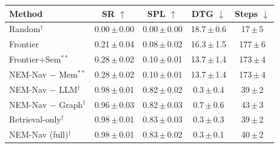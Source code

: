 \begin{tabular}{l@{\hspace{6pt}}cccc}
\toprule
\textbf{Method} & \textbf{SR} $\uparrow$ & \textbf{SPL} $\uparrow$ & \textbf{DTG} $\downarrow$ & \textbf{Steps} $\downarrow$ \\
\midrule
Random$^{\dagger}$ & 0.00\,$\pm$\,0.00 & 0.00\,$\pm$\,0.00 & 18.7\,$\pm$\,0.6 & 17\,$\pm$\,5 \\
Frontier & 0.21\,$\pm$\,0.04 & 0.08\,$\pm$\,0.02 & 16.3\,$\pm$\,1.5 & 177\,$\pm$\,6 \\
Frontier+Sem$^{**}$ & 0.28\,$\pm$\,0.02 & 0.10\,$\pm$\,0.01 & 13.7\,$\pm$\,1.4 & 173\,$\pm$\,4 \\
NEM-Nav $-$ Mem$^{**}$ & 0.28\,$\pm$\,0.02 & 0.10\,$\pm$\,0.01 & 13.7\,$\pm$\,1.4 & 173\,$\pm$\,4 \\
NEM-Nav $-$ LLM$^{\dagger}$ & 0.98\,$\pm$\,0.01 & 0.82\,$\pm$\,0.02 & 0.3\,$\pm$\,0.4 & 39\,$\pm$\,2 \\
NEM-Nav $-$ Graph$^{\dagger}$ & 0.96\,$\pm$\,0.03 & 0.82\,$\pm$\,0.03 & 0.7\,$\pm$\,0.6 & 43\,$\pm$\,3 \\
Retrieval-only$^{\dagger}$ & 0.98\,$\pm$\,0.01 & 0.83\,$\pm$\,0.03 & 0.3\,$\pm$\,0.3 & 39\,$\pm$\,2 \\
NEM-Nav (full)$^{\dagger}$ & 0.98\,$\pm$\,0.01 & 0.83\,$\pm$\,0.02 & 0.3\,$\pm$\,0.1 & 40\,$\pm$\,2 \\
\bottomrule
\end{tabular}
